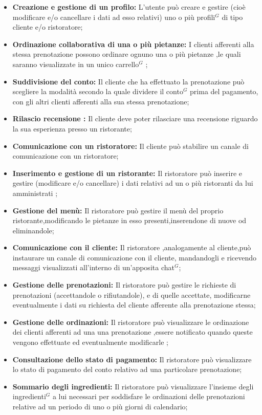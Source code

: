 \begin{itemize}
    \item \textbf{Creazione e gestione di un profilo:} L'utente può creare e gestire (cioè modificare e/o
    cancellare i dati ad esso relativi) uno o più profili$^{G}$ di tipo cliente e/o ristoratore;
    \item \textbf{Ordinazione collaborativa di una o più pietanze:} I clienti afferenti alla stessa prenotazione
    possono ordinare ognuno una o più pietanze ,le quali saranno visualizzate in un unico carrello$^{G}$ ;
    \item \textbf{Suddivisione del conto:} Il cliente che ha effettuato la prenotazione può scegliere la modalità secondo la quale
    dividere il conto$^{G}$ prima del pagamento, con gli altri clienti afferenti alla sua stessa prenotazione;
    \item \textbf{Rilascio recensione :} Il cliente deve poter rilasciare una recensione riguardo la sua
    esperienza presso un ristorante;
    \item \textbf{Comunicazione con un ristoratore:} Il cliente può stabilire un canale di comunicazione con un
    ristoratore;
    \item \textbf{Inserimento e gestione di un ristorante:} Il ristoratore può inserire e gestire (modificare e/o cancellare)
    i dati relativi ad un o più ristoranti da lui amministrati ;
    \item \textbf{Gestione del menù:} Il ristoratore può gestire il menù del proprio ristorante,modificando le pietanze in esso
    presenti,inserendone di nuove od eliminandole;
    \item \textbf{Comunicazione con il cliente:} Il ristoratore ,analogamente al cliente,può instaurare un canale di comunicazione
    con il cliente, mandandogli e ricevendo messaggi visualizzati all'interno di un'apposita chat$^{G}$;
    \item \textbf{Gestione delle prenotazioni:} Il ristoratore può gestire le richieste di prenotazioni (accettandole o rifiutandole), e
    di quelle accettate, modificarne eventualmente i dati su richiesta del cliente afferente alla prenotazione stessa;
    \item \textbf{Gestione delle ordinazioni:} Il ristoratore può visualizzare le ordinazione dei clienti afferenti ad una
    una prenotazione ,essere notificato quando queste vengono effettuate ed eventualmente modificarle ;
    \item \textbf{Consultazione dello stato di pagamento:} Il ristoratore può visualizzare lo stato di pagamento del conto relativo ad una
    particolare prenotazione;
    \item \textbf{Sommario degli ingredienti:} Il ristoratore può visualizzare l'insieme degli ingredienti$^{G}$ a lui necessari per soddisfare
    le ordinazioni delle prenotazioni  relative ad un periodo di uno o più giorni di calendario;
\end{itemize}
